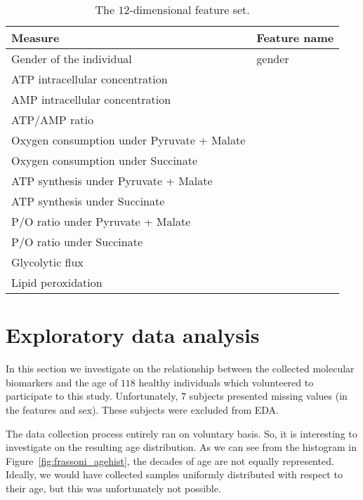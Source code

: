 \begin{table}[]
	\centering
	\caption{The $12$-dimensional feature set.}
	\label{tab:aging_features}
	\begin{tabular}{@{}ll@{}}
		\toprule
		\textbf{Measure}                                    & \textbf{Feature name}\\ \midrule
		Gender of the individual                      & gender          \\
		ATP intracellular concentration            & \atp         \\
		AMP intracellular concentration            & \amp         \\
		ATP/AMP ratio                              & \atpamp      \\
		Oxygen consumption under Pyruvate + Malate & \copyrmal    \\
		Oxygen consumption under Succinate         & \cosucc      \\
		ATP synthesis under Pyruvate + Malate      & \atppyrmal   \\
		ATP synthesis under Succinate              & \atpsucc     \\
		P/O ratio under Pyruvate + Malate          & \popyrmal    \\
		P/O ratio under Succinate                  & \posucc      \\
		Glycolytic flux                            & \ldh         \\
		Lipid peroxidation                         & \mda         \\ \bottomrule
	\end{tabular}
\end{table}


\section{Exploratory data analysis} \label{sec:frassoni_EDA}
In this section we investigate on the relationship between the collected molecular biomarkers and the age of $118$ healthy individuals which volunteered to participate to this study.
Unfortunately, $7$ subjects presented missing values (in the features \ldh and sex). These subjects were excluded from EDA.


The data collection process entirely ran on voluntary basis. So, it is interesting to investigate on the resulting age distribution. As we can see from the histogram in Figure~\ref{fig:frassoni_agehist}, the decades of age are not equally represented. Ideally, we would have collected samples uniformly distributed with respect to their age, but this was unfortunately not possible.

